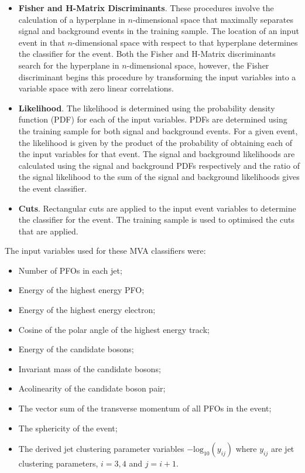 \begin{itemize}
\item \textbf{Fisher and H-Matrix Discriminants}.  These procedures involve the calculation of a hyperplane in $n$-dimensional space that maximally separates signal and background events in the training sample.  The location of an input event in that $n$-dimensional space with respect to that hyperplane determines the classifier for the event.  Both the Fisher and H-Matrix discriminants search for the hyperplane in $n$-dimensional space, however, the Fisher discriminant begins this procedure by transforming the input variables into a variable space with zero linear correlations.  
\item \textbf{Likelihood}.  The likelihood is determined using the probability density function (PDF) for each of the input variables.  PDFs are determined using the training sample for both signal and background events.  For a given event, the likelihood is given by the product of the probability of obtaining each of the input variables for that event.  The signal and background likelihoods are calculated using the signal and background PDFs respectively and the ratio of the signal likelihood to the sum of the signal and background likelihoods gives the event classifier.   
\item \textbf{Cuts}.  Rectangular cuts are applied to the input event variables to determine the classifier for the event.  The training sample is used to optimised the cuts that are applied.
\end{itemize}

The input variables used for these MVA classifiers were:
\begin{itemize}
\item Number of PFOs in each jet;
\item Energy of the highest energy PFO;
\item Energy of the highest energy electron;
\item Cosine of the polar angle of the highest energy track;
\item Energy of the candidate bosons;
\item Invariant mass of the candidate bosons;
\item Acolinearity of the candidate boson pair;
\item The vector sum of the transverse momentum of all PFOs in the event;
\item The sphericity of the event;
\item The derived jet clustering parameter variables $-\text{log}_{10}(y_{ij})$ where $y_{ij}$ are jet clustering parameters, $i = 3,4$ and $j=i+1$.  
\end{itemize}

